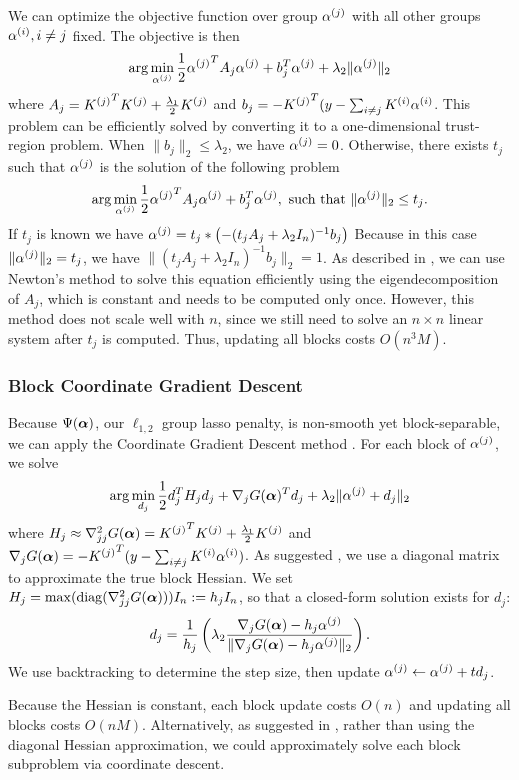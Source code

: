 We can optimize the objective function over group ${\alpha^{(j)}}$ with all other groups
${\alpha^{(i)}}, i \ne j$ fixed. The objective is then
\[
\arg\min_{\alpha^{(j)}} \frac{1}{2}{\alpha^{(j)}}^T A_j {\alpha^{(j)}} + b_j^T {\alpha^{(j)}} + \lambda_2 \|{\alpha^{(j)}}\|_2
\]
where $A_j = {K^{(j)}}^T {K^{(j)}} + \frac{\lambda_1}{2}{K^{(j)}}$ 
and $b_j = -{K^{(j)}}^T (y-\sum_{i\ne j}{{K^{(i)}} {\alpha^{(i)}}}$.
This problem can be efficiently solved \citep{bcd-group-lasso:2013} 
by converting it to a one-dimensional trust-region problem. 
When $\|b_j\|_2 \le \lambda_2$, we have ${\alpha^{(j)}} = 0$. 
Otherwise, there exists $t_j$ such that ${\alpha^{(j)}}$ is the solution of
the following problem
\[
\arg\min_{\alpha^{(j)}} \frac{1}{2}{\alpha^{(j)}}^T A_j {\alpha^{(j)}} + b_j^T {\alpha^{(j)}}, 
\text{ such that } \|{\alpha^{(j)}}\|_2 \le t_j.
\]
If $t_j$ is known we have ${\alpha^{(j)}} = t_j * \left(-(t_j A_j + \lambda_2 I_n)^{-1} b_j\right)$
Because in this case $\|{\alpha^{(j)}}\|_2 = t_j$, we have $\|(t_j A_j + \lambda_2 I_n)^{-1} b_j\|_2 = 1$.
As described in \citet{bcd-group-lasso:2013}, 
we can use Newton's method to solve this equation efficiently 
using the eigendecomposition of $A_j$, which is constant and needs to be computed only once.
However, this method does not scale well with $n$, since we still need
to solve an $n \times n$ linear system after $t_j$ is computed.
Thus, updating all blocks costs $O(n^3 M)$.

\subsubsection*{Block Coordinate Gradient Descent}

Because $\Psi({\bm{\alpha}})$, our $\ell_{1,2}$ group lasso penalty, is non-smooth yet block-separable,
we can apply the Coordinate Gradient Descent method \citep{cgd:2009}.
For each block of ${\alpha^{(j)}}$, we solve
\[
\arg\min_{d_j} \frac{1}{2}d_j^T H_j d_j + \nabla_{j}G({\bm{\alpha}})^T d_j 
+ \lambda_2 \|{\alpha^{(j)}}+d_j\|_2
\]
where $H_j \approx \nabla^2_{jj}G({\bm{\alpha}}) = {K^{(j)}}^T {K^{(j)}} + \frac{\lambda_1}{2}{K^{(j)}}$ 
and $\nabla_j G({\bm{\alpha}}) = -{K^{(j)}}^T (y-\sum_{i\ne j}{{K^{(i)}} {\alpha^{(i)}}})$.
As suggested \citet{cgd:2009}, we use a diagonal matrix to approximate the true block Hessian.
We set $H_j = \max({\rm diag}(\nabla^2_{jj}G({\bm{\alpha}}))) I_n := h_j I_n$, so that a closed-form solution exists
for $d_j$:
\[
d_j = \frac{1}{h_j}\left(\lambda_2 \frac{\nabla_j G({\bm{\alpha}}) - h_j {\alpha^{(j)}}}
{\|\nabla_j G({\bm{\alpha}}) - h_j {\alpha^{(j)}}\|_2}\right).
\]
We use backtracking to determine the step size, then update ${\alpha^{(j)}} \leftarrow {\alpha^{(j)}} + t d_j$.

Because the Hessian is constant, each block update costs $O(n)$ and updating all blocks costs $O(nM)$.
Alternatively, as suggested in \citet{note-group-lasso:2010}, rather than using the 
diagonal Hessian approximation, we could approximately solve each block subproblem via 
coordinate descent.
